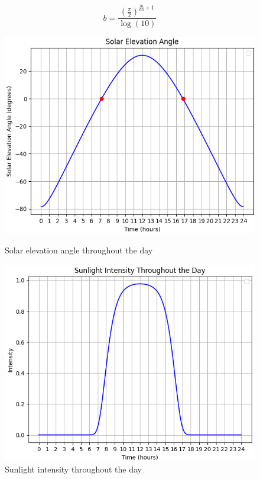 \documentclass{article}
\begin{document}
\begin{itemize}
\[
  b = \frac{\left(\frac{\pi}{2}\right)^{\frac{m}{60} + 1}}{\log(10)}
\]

\begin{figure}[h]
  \centering
  \begin{minipage}{0.45\textwidth}
      \centering
      \includegraphics[width=\textwidth]{images/SolarElevetion35N.png}
      \caption{Solar elevation angle throughout the day}
      \label{fig:SolarElevetion35N}
  \end{minipage}\hfill
  \begin{minipage}{0.45\textwidth}
      \centering
      \includegraphics[width=\textwidth]{images/SunlightIntensity35N.png}
      \caption{Sunlight intensity throughout the day}
      \label{fig:SunlightIntensity35N}
  \end{minipage}
\end{figure}


\end{itemize}
\end{document}
